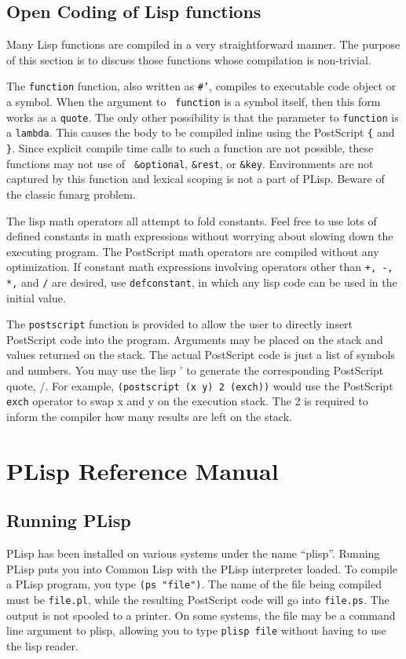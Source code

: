 \subsection {Open Coding of Lisp functions}
Many Lisp functions are compiled in a very straightforward manner.
The purpose of this section is to discuss those functions whose
compilation is non-trivial.

The {\tt function} function, also written as {\tt \#'}, compiles
to executable code object or a symbol.  When the argument to {\tt
function} is a symbol 
itself, then this form works as a {\tt quote}.  The only other
possibility is that the parameter to {\tt function} is a {\tt lambda}.
This causes the body to be compiled inline using the PostScript
\verb+{+ and \verb+}+.  Since explicit compile time calls to such a
function are not possible, these functions may not use of {\tt
\&optional}, {\tt \&rest}, or {\tt \&key}.  Environments are not
captured by this function and lexical scoping is not a part of PLisp.
Beware of the classic funarg problem.

The lisp math operators all attempt to fold constants.  Feel free to
use lots of defined constants in math expressions without worrying
about slowing down the executing program.  The PostScript math
operators are compiled without any optimization.  If constant math
expressions involving operators other than {\tt +, -, *,} and {\tt /}
are desired, use {\tt defconstant}, in which any lisp code can be used
in the initial value.

The {\tt postscript} function is provided to allow the user to
directly insert PostScript code into the program.  Arguments may be
placed on the stack and values returned on the stack.  The actual
PostScript code is just a list of symbols and numbers.  You may use
the lisp ' to generate the corresponding PostScript quote, /.  For
example, {\tt (postscript (x y) 2 (exch))} would use the PostScript
{\tt exch} operator to swap x and y on the execution stack.  The 2 is
required to inform the 
compiler how many results are left on the stack.

\section{PLisp Reference Manual}
\subsection{Running PLisp}
PLisp has been installed on various systems under the name ``plisp''.  Running
PLisp puts you into Common Lisp with the PLisp interpreter loaded.  To
compile a PLisp program, you type {\tt (ps "file")}.  The name of the file
being compiled must be {\tt file.pl}, while the resulting PostScript code will
go into {\tt file.ps}.  The output is not spooled to a printer.
On some systems, the file may be a command line argument to plisp, allowing
you to type {\tt plisp file} without having to use the lisp reader.

